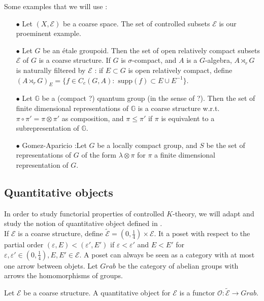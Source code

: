 \begin{Expl} Some examples that we will use :\\
\begin{itemize}
\item[$\bullet$] Let $(X,\mathcal E)$ be a coarse space. The set of controlled subsets $\mathcal E$ is our proeminent example.
\item[$\bullet$] Let $G$ be an étale groupoid. Then the set of open relatively compact subsets $\mathcal E$ of $G$ is a coarse structure. If $G$ is $\sigma$-compact, and $A$ is a $G$-algebra, $A\rtimes_r G$ is naturally filtered by $\mathcal E$ : if $E\subset G$ is open relatively compact, define $(A\rtimes_r G)_E = \{f\in C_c(G,A) : \text{ supp}(f)\subset E\cup E^{-1}\}$.
\item[$\bullet$] Let $\mathbb G$ be a (compact ?) quantum group (in the sense of ?). Then the set of finite dimensional representations of $\mathbb G$ is a coarse structure w.r.t. $\pi\circ \pi'=\pi\otimes \pi'$ as composition, and $\pi\leq\pi'$ if $\pi$ is equivalent to a subrepresentation of $\mathbb G$.
\item[$\bullet$] Gomez-Aparicio :Let $G$ be a locally compact group, and $S$ be the set of representations of $G$ of the form $\lambda\otimes\pi$ for $\pi$ a finite dimensional representation of $G$.\end{itemize}   
\end{Expl}

\subsection{Quantitative objects}
In order to study functorial properties of controlled $K$-theory, we will adapt and study the notion of quantitative object defined in \cite{OY2}.\\

If $\mathcal E$ is a coarse structure, define $\mathcal{\tilde E} = (0,\frac{1}{4})\times \mathcal E$. It a poset with respect to the partial order $(\varepsilon,E)<(\varepsilon', E')$ if $\varepsilon<\varepsilon'$ and $E<E'$ for $\varepsilon,\varepsilon'\in (0,\frac{1}{4}),E,E'\in\mathcal E$. A poset can always be seen as a category with at most one arrow between objets. Let $Grab$ be the category of abelian groups with arrows the homomorphisms of groups.
\begin{definition}
Let $\mathcal E$ be a coarse structure. A quantitative object for $\mathcal E$ is a functor $\mathcal O :  \mathcal{\tilde E} \rightarrow Grab$.
\end{definition}

